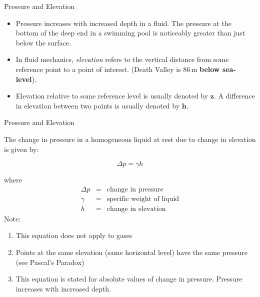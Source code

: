 \documentclass[9pt,xcolor={svgnames, x11names},professionalfonts, mathserif]{beamer}
\begin{document}
\begin{frame}{Pressure and Elevation}
	\begin{itemize}
		\item Pressure increases with increased depth in a fluid. The pressure at
		      the bottom of the deep end in a swimming pool is noticeably greater
		      than just below the surface. \pause\parb
		\item In fluid mechanics, \emph{elevation} refers to the vertical distance
		      from some reference point to a point of interest. (Death Valley is
		      $86\,\text{m}$\textbf{ below sea-level}). \pause\parb
		\item Elevation relative to some reference level is usually denoted by $\bm z$. \lb A difference in elevation between two points is usually denoted by $\bm h$.
	\end{itemize}
\end{frame}

\begin{frame}{Pressure and Elevation}
	
	
	The change in pressure in a homogeneous liquid at rest due to change
	in elevation is given by:
	\begin{center}
		\begin{mybox}[width=4cm]
			\[\Delta p=\gamma h\]
		\end{mybox}
	\end{center}
	
	where
	\vspace{-0.5cm}
	\begin{eqnarray*}
		\Delta p & = & \text{change  in  pressure}\\
		\gamma & = & \text{specific weight of  liquid}\\
		h & = & \text{change in elevation}
	\end{eqnarray*} \pause
	Note:
	\begin{enumerate}
		\item This equation does not apply to gases
		\item Points at the same elevation (same horizontal level) have the same
		      pressure (see Pascal's Paradox)
		\item This equation is stated for absolute values of change in pressure. \lb Pressure increases with increased depth.
	\end{enumerate}
	
\end{frame}
\end{document}

